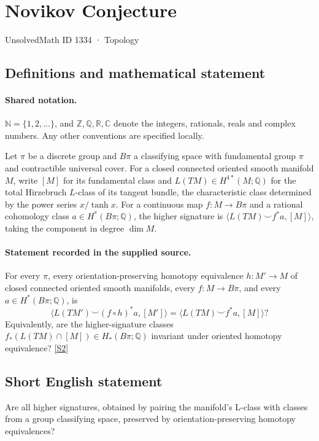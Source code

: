 \documentclass[11pt]{article}
\newcommand{\sref}[2]{\hyperlink{source:#1:#2}{[S#2]}}
\begin{document}
\setcounter{section}{1333}
\section{Novikov Conjecture}\label{1334}
{\small\sffamily UnsolvedMath ID 1334 · Topology}
\subsection{Definitions and mathematical statement}

\paragraph{Shared notation.}$\mathbb N=\{1,2,\ldots\}$, and $\mathbb Z,\mathbb Q,\mathbb R,\mathbb C$ denote the integers, rationals, reals and complex numbers. Any other conventions are specified locally.


Let $\pi$ be a discrete group and $B\pi$ a classifying space with fundamental group $\pi$ and contractible universal cover. For a closed connected oriented smooth manifold $M$, write $[M]$ for its fundamental class and $L(TM)\in H^{4*}(M;\mathbb Q)$ for the total Hirzebruch $L$-class of its tangent bundle, the characteristic class determined by the power series $x/\tanh x$. For a continuous map $f:M\to B\pi$ and a rational cohomology class $a\in H^*(B\pi;\mathbb Q)$, the higher signature is $\langle L(TM)\smile f^*a,[M]\rangle$, taking the component in degree $\dim M$.
\paragraph{Statement recorded in the supplied source.}
For every $\pi$, every orientation-preserving homotopy equivalence $h:M'\to M$ of closed connected oriented smooth manifolds, every $f:M\to B\pi$, and every $a\in H^*(B\pi;\mathbb Q)$, is
\[
 \langle L(TM')\smile(f\circ h)^*a,[M']\rangle
 =\langle L(TM)\smile f^*a,[M]\rangle?
\]
Equivalently, are the higher-signature classes $f_*(L(TM)\cap[M])\in H_*(B\pi;\mathbb Q)$ invariant under oriented homotopy equivalence? \sref{1334}{2}
\subsection{Short English statement}
Are all higher signatures, obtained by pairing the manifold’s L-class with classes from a group classifying space, preserved by orientation-preserving homotopy equivalences?
\end{document}
